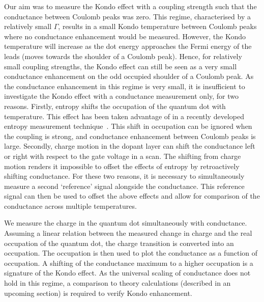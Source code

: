 Our aim was to measure the Kondo effect with a coupling strength such that the conductance between Coulomb peaks was zero. This regime, characterised by a relatively small $\Gamma$, results in a small Kondo temperature between Coulomb peaks where no conductance enhancement would be measured. However, the Kondo temperature will increase as the dot energy approaches the Fermi energy of the leads (moves towards the shoulder of a Coulomb peak). Hence, for relatively small coupling strengths, the Kondo effect can still be seen as a very small conductance enhancement on the odd occupied shoulder of a Coulomb peak. As the conductance enhancement in this regime is very small, it is insufficient to investigate the Kondo effect with a conductance measurement only, for two reasons. Firstly, entropy shifts the occupation of the quantum dot with temperature. This effect has been taken advantage of in a recently developed entropy measurement technique~\cite{hartman, child_strong, child_meas}. This shift in occupation can be ignored when the coupling is strong, and conductance enhancement between Coulomb peaks is large. Secondly, charge motion in the dopant layer can shift the conductance left or right with respect to the gate voltage in a scan. The shifting from charge motion renders it impossible to offset the effects of entropy by retroactively shifting conductance. For these two reasons, it is necessary to simultaneously measure a second `reference' signal alongside the conductance. This reference signal can then be used to offset the above effects and allow for comparison of the conductance across multiple temperatures. 

We measure the charge in the quantum dot simultaneously with conductance. Assuming a linear relation between the measured change in charge and the real occupation of the quantum dot, the charge transition is converted into an occupation. The occupation is then used to plot the conductance as a function of occupation. A shifting of the conductance maximum to a higher occupation is a signature of the Kondo effect. 
As the universal scaling of conductance does not hold in this regime, a comparison to theory calculations (described in an upcoming section) is required to verify Kondo enhancement. 





